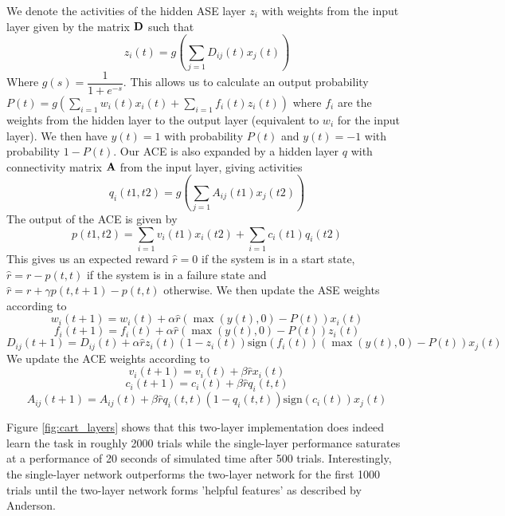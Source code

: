 \documentclass{article}
\begin{document}
We denote the activities of the hidden ASE layer $z_i$ with weights from the input layer given by the matrix $\bf D$ such that
\begin{equation}
z_i(t) = g(\sum_{j=1}{D_{ij}(t) x_j(t)})
\end{equation}
Where $g(s) = \dfrac{1}{1+e^{-s}}$. This allows us to calculate an output probability 
$
P(t) = g(\sum_{i=1}{w_{i}(t) x_i(t)} + \sum_{i=1}{f_i(t)z_i(t)})
$ 
where $f_i$ are the weights from the hidden layer to the output layer (equivalent to $w_i$ for the input layer).
We then have $y(t) = 1$ with probability $P(t)$ and $y(t) = -1$ with probability $1-P(t)$.
Our ACE is also expanded by a hidden layer  $q$ with connectivity matrix $\bf A$ from the input layer, giving activities
\begin{equation}
q_i(t1, t2) = g(\sum_{j=1}{A_{ij}(t1) x_j(t2)})
\end{equation}
The output of the ACE is given by
\begin{equation}
p(t1,t2) = \sum_{i=1}{v_{i}(t1) x_i(t2)} + \sum_{i=1}{c_i(t1)q_i(t2)}
\end{equation}
This gives us an expected reward $\hat r = 0$ if the system is in a start state, $\hat r = r - p(t,t)$ if the system is in a failure state and $\hat r = r + \gamma p(t,t+1) - p(t,t)$ otherwise.
We then update the ASE weights according to
\begin{equation}
w_i(t+1) = w_i(t) + \alpha \hat r (\max{(y(t), 0)} - P(t))x_i(t)
\end{equation}
\begin{equation}
f_i(t+1) = f_i(t) + \alpha \hat r (\max{(y(t), 0)} - P(t))z_i(t)
\end{equation}
\begin{equation}
D_{ij}(t+1) = D_{ij}(t) + \alpha \hat r  z_i(t) (1-z_i(t))\text{sign}(f_i(t)) (\max{(y(t), 0)} - P(t))x_j(t)
\end{equation}
We update the ACE weights according to
\begin{equation}
v_i(t+1) = v_i(t) + \beta \hat r  x_i(t)
\end{equation}
\begin{equation}
c_i(t+1) = c_i(t) + \beta \hat r  q_i(t,t)
\end{equation}
\begin{equation}
A_{ij}(t+1) = A_{ij}(t) + \beta \hat r q_i(t,t) (1-q_i(t,t))\text{sign}(c_i(t)) x_j(t)
\end{equation}

Figure \ref{fig:cart_layers} shows that this two-layer implementation does indeed learn the task in roughly 2000 trials while the single-layer performance saturates at a performance of 20 seconds of simulated time after 500 trials. Interestingly, the single-layer network outperforms the two-layer network for the first 1000 trials until the two-layer network forms 'helpful features' as described by Anderson.
\end{document}
